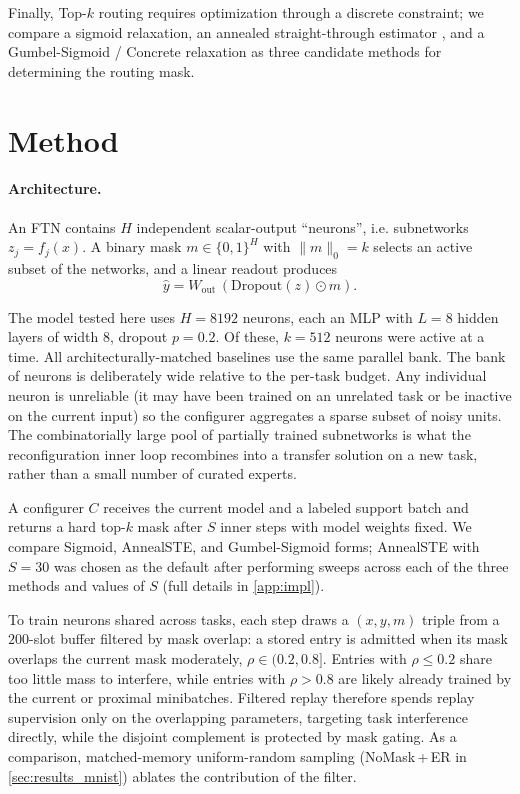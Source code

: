 \documentclass[11pt]{article}
\begin{document}
Finally, Top-$k$ routing requires optimization through a discrete constraint; we compare a sigmoid relaxation, an annealed straight-through estimator \citep{bengio2013estimating}, and a Gumbel-Sigmoid / Concrete relaxation \citep{jang2017categorical,maddison2017concrete} as three candidate methods for determining the routing mask.



\section{Method}\label{sec:method}

\paragraph{Architecture.}
An FTN contains $H$ independent scalar-output ``neurons'', i.e. subnetworks $z_j=f_j(x)$. A binary mask $m\in\{0,1\}^H$ with $\|m\|_0=k$ selects an active subset of the networks, and a linear readout produces
\[
  \hat{y} = W_\mathrm{out}\,(\mathrm{Dropout}(z)\odot m).
\]

The model tested here uses $H=8192$ neurons, each an MLP with $L=8$ hidden layers of width $8$, dropout $p=0.2$. Of these, $k=512$ neurons were active at a time. All architecturally-matched baselines use the same parallel bank. The bank of neurons is deliberately wide relative to the per-task budget. Any individual neuron is unreliable (it may have been trained on an unrelated task or be inactive on the current input) so the configurer aggregates a sparse subset of noisy units. The combinatorially large pool of partially trained subnetworks is what the reconfiguration inner loop recombines into a transfer solution on a new task, rather than a small number of curated experts.

A configurer $C$ receives the current model and a labeled support batch and returns a hard top-$k$ mask after $S$ inner steps with model weights fixed. We compare Sigmoid, AnnealSTE, and Gumbel-Sigmoid forms; AnnealSTE with $S{=}30$ was chosen as the default after performing sweeps across each of the three methods and values of $S$ (full details in \cref{app:impl}).

To train neurons shared across tasks, each step draws a $(x,y,m)$ triple from a $200$-slot buffer filtered by mask overlap: a stored entry is admitted when its mask overlaps the current mask moderately, $\rho \in (0.2, 0.8]$. Entries with $\rho \le 0.2$ share too little mass to interfere, while entries with $\rho > 0.8$ are likely already trained by the current or proximal minibatches. Filtered replay therefore spends replay supervision only on the overlapping parameters, targeting task interference directly, while the disjoint complement is protected by mask gating. As a comparison, matched-memory uniform-random sampling (NoMask\,+\,ER in \cref{sec:results_mnist}) ablates the contribution of the filter.
\end{document}
